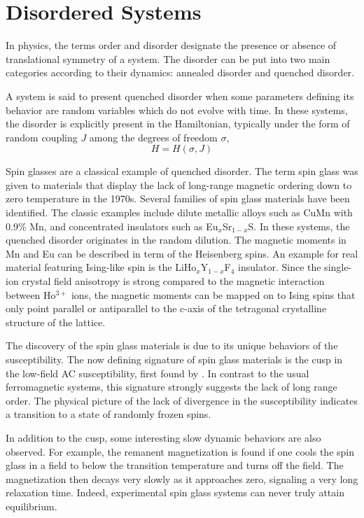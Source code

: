 \section{Disordered Systems}
In physics, the terms order and disorder designate the presence or absence of 
translational symmetry of a system. The disorder can be put into two main categories 
according to their dynamics: annealed disorder and quenched disorder.

A system is said to present quenched disorder when 
some parameters defining its behavior are random variables which do not evolve 
with time. In these systems, the disorder is explicitly present in the Hamiltonian, 
typically under the form of random coupling $J$ among the degrees of freedom $\sigma$,
\begin{equation}
  \label{eq:4}
  H=H(\sigma,J)
\end{equation}

Spin glasses \cite{Binder-Young-1986} are a classical example of quenched disorder. 
The term spin glass was given to materials that display the lack of long-range
magnetic ordering down to zero temperature in the 1970s. 
Several families of spin glass materials have been identified. The classic examples include 
dilute metallic alloys such as CuMn with 0.9\% Mn, and concentrated insulators 
such as Eu$_x$Sr$_{1-x}$S. In these systems, the quenched disorder originates in the random dilution.
The magnetic moments in Mn and Eu can be described in term of the Heisenberg spins.
An example for real material featuring Ising-like spin is the 
LiHo$_x$Y$_{1-x}$F$_4$ insulator\cite{Brooke779,Brooke:2001qf,Ghosh:2003xy,Silevitch:2007sf,PhysRevB.42.4631,PhysRevLett.71.1919}. 
Since the single-ion crystal field anisotropy
is strong compared to the magnetic interaction between Ho$^{3+}$ ions, the magnetic 
moments can be mapped on to Ising spins that only point parallel or antiparallel
to the c-axis of the tetragonal crystalline structure of the lattice. 

The discovery of the spin glass materials is due to its unique behaviors of
the susceptibility. The now defining signature of spin glass materials is 
the cusp in the low-field AC susceptibility, first found by \citet{PhysRevB.6.4220}.
In contrast to the usual ferromagnetic systems, this signature strongly 
suggests the lack of long range order. The physical picture of the lack 
of divergence in the susceptibility indicates a transition to a state of randomly 
frozen spins. 

In addition to the cusp, some interesting slow dynamic 
behaviors are also observed. For example, the remanent magnetization 
is found if one cools the spin glass in a field to below the transition temperature and 
turns off the field. The magnetization then decays very slowly as it approaches 
zero, signaling a very long relaxation time. Indeed, experimental spin glass
systems can never truly attain equilibrium. 

